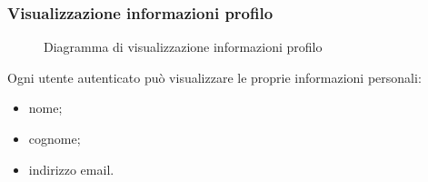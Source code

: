 \documentclass[a4paper, titlepage]{article}
\begin{document}
\newpage
\subsubsection{Visualizzazione informazioni profilo}
\begin{figure}[H]
	\centering
	\noindent{}
	\caption{Diagramma di visualizzazione informazioni profilo}
\end{figure}
Ogni utente autenticato può visualizzare le proprie informazioni personali: 
\begin{itemize}
	\item nome;
	\item cognome;
	\item indirizzo email.
\end{itemize}

\newpage
\end{document}
